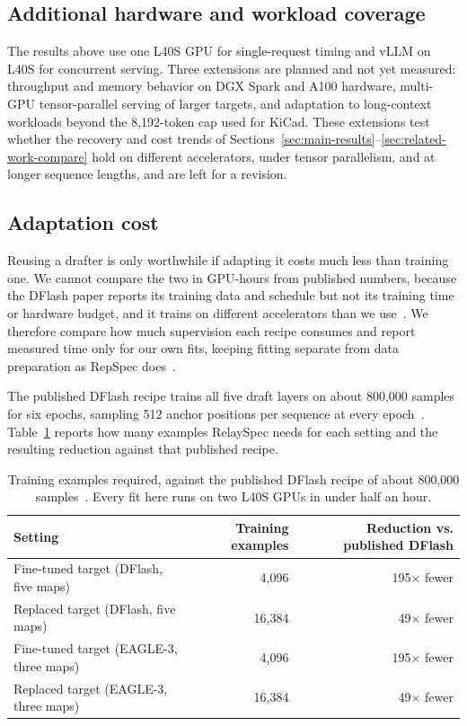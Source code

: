 \subsection{Additional hardware and workload coverage}
\label{sec:future-hw}
The results above use one L40S GPU for single-request timing and vLLM on L40S for concurrent serving. Three extensions are planned and not yet measured: throughput and memory behavior on DGX Spark and A100 hardware, multi-GPU tensor-parallel serving of larger targets, and adaptation to long-context workloads beyond the 8{,}192-token cap used for KiCad. These extensions test whether the recovery and cost trends of Sections~\ref{sec:main-results}--\ref{sec:related-work-compare} hold on different accelerators, under tensor parallelism, and at longer sequence lengths, and are left for a revision.

\subsection{Adaptation cost}
\label{sec:adaptation-cost}
Reusing a drafter is only worthwhile if adapting it costs much less than training one. We cannot compare the two in GPU-hours from published numbers, because the DFlash paper reports its training data and schedule but not its training time or hardware budget, and it trains on different accelerators than we use~\citep{chen2026dflash}. We therefore compare how much supervision each recipe consumes and report measured time only for our own fits, keeping fitting separate from data preparation as RepSpec does~\citep{huo2026repspec}.

The published DFlash recipe trains all five draft layers on about 800{,}000 samples for six epochs, sampling 512 anchor positions per sequence at every epoch~\citep{chen2026dflash}. Table~\ref{tab:cost} reports how many examples RelaySpec needs for each setting and the resulting reduction against that published recipe.

\begin{table}[t]
\centering
\caption{Training examples required, against the published DFlash recipe of about 800{,}000 samples~\citep{chen2026dflash}. Every fit here runs on two L40S GPUs in under half an hour.}
\label{tab:cost}
\small
\begin{tabular}{lrr}
\toprule
Setting & Training examples & Reduction vs. published DFlash \\
\midrule
Fine-tuned target (DFlash, five maps) & 4{,}096 & 195$\times$ fewer \\
Replaced target (DFlash, five maps) & 16{,}384 & 49$\times$ fewer \\
Fine-tuned target (EAGLE-3, three maps) & 4{,}096 & 195$\times$ fewer \\
Replaced target (EAGLE-3, three maps) & 16{,}384 & 49$\times$ fewer \\
\bottomrule
\end{tabular}
\end{table}

